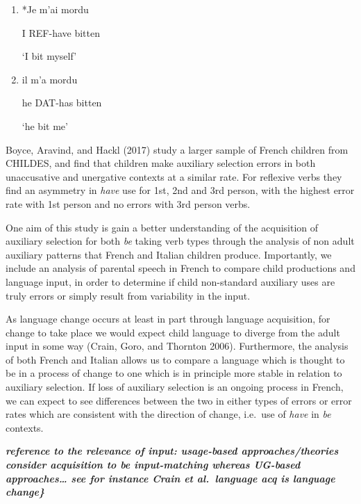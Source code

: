 \documentclass[
  12pt,
]{article}
\begin{document}
\begin{enumerate}[resume*]
  \item{*Je m'ai mordu \label{ex:clitics-1}}
  
        I REF-have bitten
        
       `I bit myself'
  
  \item{il m'a mordu \label{ex:clitics-2}}
  
         he DAT-has bitten
        
        `he bit me'
  \end{enumerate}

Boyce, Aravind, and Hackl (2017) study a larger sample of French children from CHILDES, and find that children make auxiliary selection errors in both unaccusative and unergative contexts at a similar rate. For reflexive verbs they find an asymmetry in \emph{have} use for 1st, 2nd and 3rd person, with the highest error rate with 1st person and no errors with 3rd person verbs.

One aim of this study is gain a better understanding of the acquisition of auxiliary selection for both \emph{be} taking verb types through the analysis of non adult auxiliary patterns that French and Italian children produce. Importantly, we include an analysis of parental speech in French to compare child productions and language input, in order to determine if child non-standard auxiliary uses are truly errors or simply result from variability in the input.

As language change occurs at least in part through language acquisition, for change to take place we would expect child language to diverge from the adult input in some way (Crain, Goro, and Thornton 2006). Furthermore, the analysis of both French and Italian allows us to compare a language which is thought to be in a process of change to one which is in principle more stable in relation to auxiliary selection. If loss of auxiliary selection is an ongoing process in French, we can expect to see differences between the two in either types of errors or error rates which are consistent with the direction of change, i.e.~use of \emph{have} in \emph{be} contexts.

\textbf{\emph{reference to the relevance of input: usage-based approaches/theories consider acquisition to be input-matching whereas UG-based approaches\ldots{} see for instance Crain et al.~language acq is language change\}}}

\newpage
\end{document}
